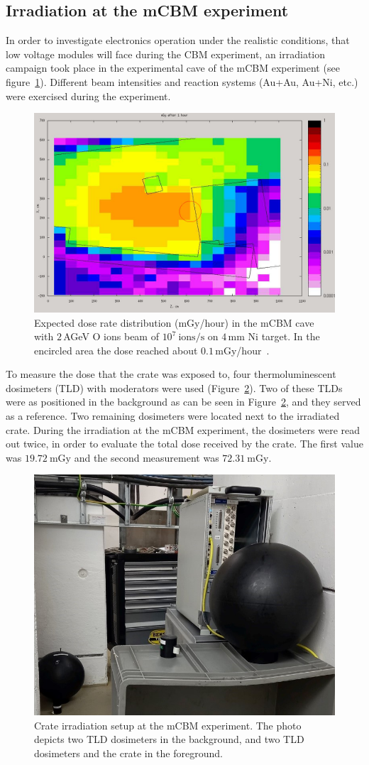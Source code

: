 \subsection{Irradiation at the mCBM experiment}
In order to investigate electronics operation under the realistic conditions, that low voltage modules will face during the CBM experiment, an irradiation campaign took place in the experimental cave of the \gls{mCBM} experiment (see figure~\ref{fig:CBM1}). Different beam intensities and reaction systems (Au+Au, Au+Ni, etc.) were exercised during the experiment.
\begin{figure}[!h]
    \centering
    \includegraphics[width=0.65\columnwidth]{Chapter4/images/dose1.jpg}
    \caption{Expected dose rate distribution (mGy/hour) in the \gls{mCBM} cave with $2$\,AGeV O ions beam of $10^{7}\mathrm{\ ions/s}$ on $4$\,mm Ni target. In the encircled area the dose reached about $0.1$\,mGy/hour~\cite{fluka_senger}.}
     \label{fig:CBM1}
\end{figure}


To measure the dose that the crate was exposed to, four thermoluminescent dosimeters (\gls{TLD}) with moderators were used (Figure~\ref{fig:crate}). Two of these TLDs were as positioned in the background as can be seen in Figure~\ref{fig:crate}, and they served as a reference. Two remaining dosimeters were located next to the irradiated crate. During the irradiation at the \gls{mCBM} experiment, the dosimeters were read out twice, in order to evaluate the total dose received by the crate. The first value was $19.72\mathrm{\ mGy}$ and  the second measurement was $72.31\mathrm{\ mGy}$. 


\newpage
\begin{figure}[!h]
    \centering
    \includegraphics[width=0.5\columnwidth]{Chapter4/images/crate.jpg}
    \caption{Crate irradiation setup at the \gls{mCBM} experiment. The photo depicts two TLD dosimeters in the background, and two TLD dosimeters and the crate in the foreground.}
    \label{fig:crate}
\end{figure}


